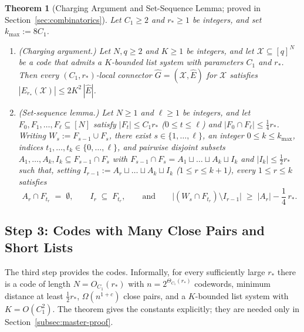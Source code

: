 \documentclass[11pt]{article}
\newtheorem{theorem}{Theorem}[section]
\theoremstyle{definition}
\theoremstyle{remark}
\begin{document}
\begin{theorem}[Charging Argument and Set-Sequence Lemma; proved in Section~\ref{sec:combinatorics}]
\label{thm:mod2-combinatorial}
Let $C_1 \ge 2$ and $r_* \ge 1$ be integers, and set $k_{\max} := 8 C_1$.
\begin{enumerate}[label=(\alph*)]
  \item \emph{(Charging argument.)} Let $N, q \ge 2$ and $K \ge 1$ be integers, and let $\mathcal{X} \subseteq [q]^N$ be a code that admits a $K$-bounded list system with parameters $C_1$ and $r_*$. Then every $(C_1, r_*)$-local connector $\widehat{G} = (\mathcal{X}, \widehat{E})$ for $\mathcal{X}$ satisfies $|E_{r_*}(\mathcal{X})| \le 2 K^2\,|\widehat{E}|$.
  \item \emph{(Set-sequence lemma.)} Let $N \ge 1$ and $\ell \ge 1$ be integers, and let $F_0, F_1, \dots, F_\ell \subseteq [N]$ satisfy $|F_t| \le C_1 r_*$ ($0 \le t \le \ell$) and $|F_0 \cap F_\ell| \le \frac{1}{4} r_*$. Writing $W_s := F_{s-1} \cup F_s$, there exist $s \in \{1, \dots, \ell\}$, an integer $0 \le k \le k_{\max}$, indices $t_1, \dots, t_k \in \{0, \dots, \ell\}$, and pairwise disjoint subsets $A_1, \dots, A_k, I_k \subseteq F_{s-1} \cap F_s$ with $F_{s-1} \cap F_s = A_1 \sqcup \dots \sqcup A_k \sqcup I_k$ and $|I_k| \le \frac{1}{2} r_*$ such that, setting $I_{r-1} := A_r \sqcup \dots \sqcup A_k \sqcup I_k$ ($1 \le r \le k + 1$), every $1 \le r \le k$ satisfies
  \[
  A_r \cap F_{t_r} \;=\; \emptyset, \qquad I_r \;\subseteq\; F_{t_r}, \qquad \text{and} \qquad \bigl|(W_s \cap F_{t_r}) \setminus I_{r-1}\bigr| \;\ge\; |A_r| - \frac{1}{4}\,r_*.
  \]
\end{enumerate}
\end{theorem}

\subsection{Step 3: Codes with Many Close Pairs and Short Lists}
\label{subsec:mod3}

The third step provides the codes. Informally, for every sufficiently large $r_*$ there is a code of length $N = O_{C_1}(r_*)$ with $n = 2^{\Theta_{C_1}(r_*)}$ codewords, minimum distance at least $\frac{1}{2} r_*$, $\Omega(n^{1 + c})$ close pairs, and a $K$-bounded list system with $K = O(C_1^2)$. The theorem gives the constants explicitly; they are needed only in Section~\ref{subsec:master-proof}.
\end{document}
